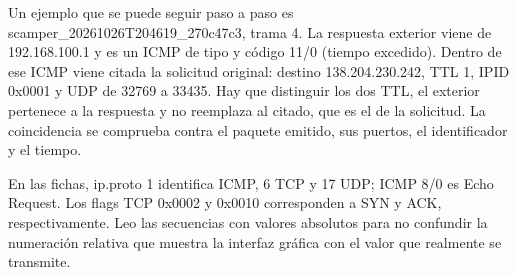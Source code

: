 Un ejemplo que se puede seguir paso a paso es scamper\_20261026T204619\_270c47c3, trama 4. La respuesta exterior viene de 192.168.100.1 y es un ICMP de tipo y código 11/0 (tiempo excedido). Dentro de ese ICMP viene citada la solicitud original: destino 138.204.230.242, TTL 1, IPID 0x0001 y UDP de 32769 a 33435. Hay que distinguir los dos TTL, el exterior pertenece a la respuesta y no reemplaza al citado, que es el de la solicitud. La coincidencia se comprueba contra el paquete emitido, sus puertos, el identificador y el tiempo. 

En las fichas, ip.proto 1 identifica ICMP, 6 TCP y 17 UDP; ICMP 8/0 es Echo Request. Los flags TCP 0x0002 y 0x0010 corresponden a SYN y ACK, respectivamente. Leo las secuencias con valores absolutos para no confundir la numeración relativa que muestra la interfaz gráfica con el valor que realmente se transmite.
